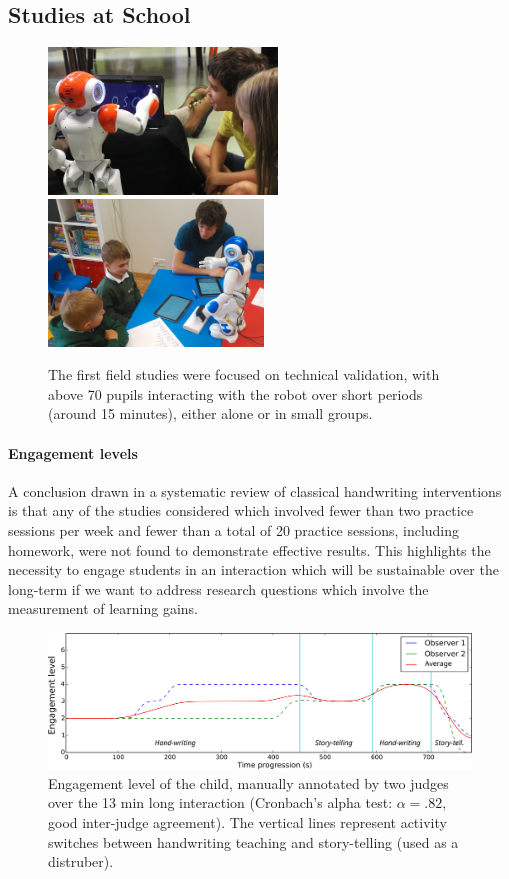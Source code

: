 \documentclass{article}
\begin{document}
\subsection{Studies at School}

\begin{figure}
    \centering
    \includegraphics[height=3.9cm]{schools}
    \includegraphics[height=3.9cm]{schools2}
    \caption{\small The first field studies were focused on technical validation, with
    above 70 pupils interacting with the robot over short periods (around 15
minutes), either alone or in small groups.}
    \label{fig:schools}
\end{figure}

\paragraph{Engagement levels}

A conclusion drawn in a systematic review of classical handwriting
interventions~\cite{Hoy2011} is that any of the studies considered which
involved fewer than two practice sessions per week and fewer than a total of 20
practice sessions, including homework, were not found to demonstrate effective
results. This highlights the necessity to engage students in an interaction
which will be sustainable over the long-term if we want to address research
questions which involve the measurement of learning gains.

\begin{figure}
    \centering
    \includegraphics[width=0.9\linewidth]{engagement}
    \caption{Engagement level of the child, manually annotated by two judges
        over the 13 min long interaction (Cronbach’s alpha test: $\alpha = .82$,
        good inter-judge agreement). The vertical lines represent activity
    switches between handwriting teaching and story-telling (used as a
    distruber).}
    \label{}
\end{figure}
\end{document}
